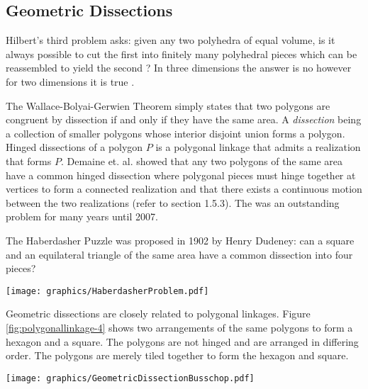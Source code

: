 \documentclass[10pt]{CSUNthesis}
\theoremstyle{plain}%
\theoremstyle{definition}
\theoremstyle{remark}
\begin{document}
\subsection{Geometric Dissections}
Hilbert's third problem asks: given any two polyhedra of equal volume, is it always possible to cut the first into finitely many polyhedral pieces which can be reassembled to yield the second \cite{aigner2010hilbert}?  
In three dimensions the answer is no however for two dimensions it is true \cite{10.23073621846}.

The Wallace-Bolyai-Gerwien Theorem simply states that two polygons are congruent by dissection if and only if they have the same area.  
A \textit{dissection} being a collection of smaller polygons whose interior disjoint union forms a polygon.
Hinged dissections of a polygon $P$ is a polygonal linkage that admits a realization that forms $P$.  
Demaine et. al. \cite{abbott2012hinged} showed that any two polygons of the same area have a common hinged dissection where polygonal pieces must hinge together at vertices to form a connected realization and that there exists a continuous motion between the two realizations (refer to section 1.5.3).
The was an outstanding problem for many years until 2007.

The Haberdasher Puzzle was proposed in 1902 by Henry Dudeney: can a square and an equilateral triangle of the same area have a common dissection into four pieces? 

\begin{minipage}{\linewidth}
\begin{center}
\texttt{[image: graphics/HaberdasherProblem.pdf]}
\end{center}
\label{fig:polygonallinkage-5}
\end{minipage}

Geometric dissections are closely related to polygonal linkages.  
Figure \ref{fig:polygonallinkage-4} shows two arrangements of the same polygons to form a hexagon and a square. 
The polygons are not hinged and are arranged in differing order.
The polygons are merely tiled together to form the hexagon and square. 

\begin{minipage}{\linewidth}\begin{center}
\texttt{[image: graphics/GeometricDissectionBusschop.pdf]}
\end{center}
\label{fig:polygonallinkage-4}
\end{minipage}
\end{document}
